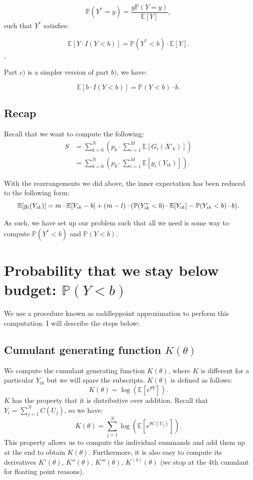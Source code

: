 \documentclass[a4paper,11pt]{article}
\begin{document}
$$
\mathbb{P}(Y^* = y) = \frac{y \mathbb{P} (Y=y)}{\mathbb{E}[Y]},
$$
such that $Y^*$ satisfies:

$$
 \mathbb{E}[Y \cdot I( Y < b)] = \mathbb{P}(Y^* < b) \cdot \mathbb{E}[Y].
$$,

\noindent
Part $c)$ is a simpler version of part $b)$, we have:

$$
 \mathbb{E}[b \cdot I( Y < b)] = \mathbb{P}(Y < b) \cdot b.
$$

\subsection{Recap}

Recall that we want to compute the following:
\begin{align*}
S &= \sum^N_{k=0} (p_k  \cdot \sum^M_{i=1}  \mathbb{E}[  G_i(X'_k)  ]) \\
&=  \sum^N_{k=0} (p_k  \cdot \sum^M_{i=1}  \mathbb{E}[g_i(Y_{ik})  ]).
\end{align*}

With the rearrangements we did above, the inner expectation has been reduced to the following form: 
$$
\mathbb{E}[g_i(Y_{ik})] =  m \cdot \mathbb{E}[Y_{ik}-b] + (m-l) \cdot (\mathbb{P}(Y^*_{ik} < b) \cdot \mathbb{E}[Y_{ik}] -  \mathbb{P}(Y_{ik} < b) \cdot b). \\ 
$$


As such, we have set up our problem such that all we need is some way to compute $\mathbb{P}(Y^* < b)$ and $\mathbb{P}(Y < b)$.

\section{Probability that we stay below budget: $\mathbb{P}(Y < b)$}\label{prob_section}

We use a procedure known as saddleppoint approximation to perform this computation. I will describe the steps below:

\subsection{Cumulant generating function $K(\theta)$}

We compute the cumulant generating function $K(\theta)$, where $K$ is different for a particular $Y_{ik}$ but we will spare the subscripts. $K(\theta)$ is defined as follows:
$$
K(\theta) = \log(\mathbb{E}[ e^{\theta Y}]).
$$
$K$ has the property that it is distributive over addition. Recall that $Y_i = \sum^N_{j=1}C(U_j)$, so we have:
$$
K(\theta) = \sum^N_{j=1}{\log(\mathbb{E}[ e^{\theta C(U_j)}])}.
$$
This property allows us to compute the individual summands and add them up at the end to obtain $K(\theta)$. Furthermore, it is also easy to compute its derivatives $K'(\theta)$, $K''(\theta)$, $K'''(\theta)$, $K^{(4)}(\theta)$ (we stop at the 4th cumulant for floating point reasons).
\end{document}
